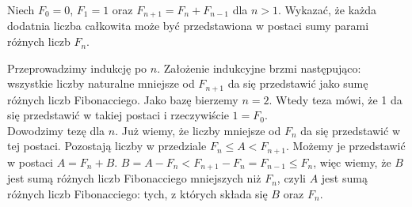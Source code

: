 \documentclass{../note}
\begin{document}
\begin{zadanie}{3}
Niech $F_{0}=0$, $F_{1}=1$ oraz $F_{n+1}=F_{n}+F_{n-1}$ dla $n > 1$. Wykazać, że każda dodatnia liczba całkowita może być przedstawiona w postaci sumy parami różnych liczb $F_{n}$.
\end{zadanie}
\begin{rozwiazanie}
Przeprowadzimy indukcję po $n$. Założenie indukcyjne brzmi następująco: wszystkie liczby naturalne mniejsze od $F_{n+1}$ da się przedstawić jako sumę różnych liczb Fibonacciego. Jako bazę bierzemy $n=2$. Wtedy teza mówi, że 1 da się przedstawić w takiej postaci i rzeczywiście $1 = F_0$.\\
Dowodzimy tezę dla $n$. Już wiemy, że liczby mniejsze od $F_n$ da się przedstawić w tej postaci. Pozostają liczby w przedziale $F_n \leq A < F_{n+1}$. Możemy je przedstawić w postaci $A = F_n + B$. $B = A - F_n < F_{n+1} - F_n = F_{n-1} \leq F_n$, więc wiemy, że $B$ jest sumą różnych liczb Fibonacciego mniejszych niż $F_n$, czyli $A$ jest sumą różnych liczb Fibonacciego: tych, z których składa się $B$ oraz $F_n$.
\end{rozwiazanie}
\end{document}
